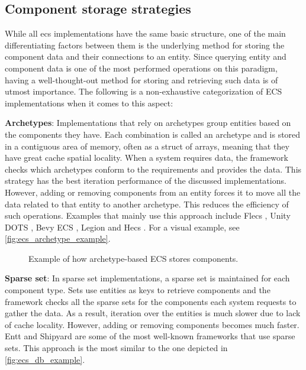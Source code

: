 \documentclass[twoside, 11pt]{article}
\begin{document}
\subsection{Component storage strategies}

While all \gls{ecs} implementations have the same basic structure, one of the main differentiating factors between them is the underlying method for storing the component data and their connections to an entity. Since querying entity and component data is one of the most performed operations on this paradigm, having a well-thought-out method for storing and retrieving such data is of utmost importance. The following is a non-exhaustive categorization of ECS implementations when it comes to this aspect:

\textbf{Archetypes}: Implementations that rely on archetypes group entities based on the components they have. Each combination is called an archetype and is stored in a contiguous area of memory, often as a struct of arrays, meaning that they have great cache spatial locality. When a system requires data, the framework checks which archetypes conform to the requirements and provides the data. This strategy has the best iteration performance of the discussed implementations. However, adding or removing components from an entity forces it to move all the data related to that entity to another archetype. This reduces the efficiency of such operations. Examples that mainly use this approach include Flecs \cite{flecs}, Unity DOTS \cite{unityDots}, Bevy ECS \cite{bevy}, Legion \cite{legion} and Hecs \cite{hecs}. For a visual example, see \autoref{fig:ecs_archetype_example}.

\begin{figure}[h!]
  \centering
  
  \caption[Example of how archetype-based ECS stores components]{Example of how archetype-based ECS stores components.}
  \label{fig:ecs_archetype_example}
\end{figure}

\textbf{Sparse set}: In sparse set implementations, a sparse set is maintained for each component type. Sets use entities as keys to retrieve components and the framework checks all the sparse sets for the components each system requests to gather the data. As a result, iteration over the entities is much slower due to lack of cache locality. However, adding or removing components becomes much faster. Entt \cite{entt} and Shipyard \cite{shipyard} are some of the most well-known frameworks that use sparse sets. This approach is the most similar to the one depicted in \autoref{fig:ecs_db_example}.
\end{document}
